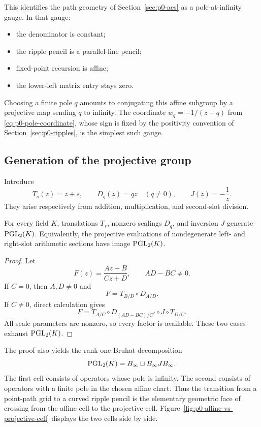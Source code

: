 This identifies the path geometry of Section~\ref{sec:p0-aes} as a
pole-at-infinity gauge.  In that gauge:

\begin{itemize}
  \item the denominator is constant;
  \item the ripple pencil is a parallel-line pencil;
  \item fixed-point recursion is affine;
  \item the lower-left matrix entry stays zero.
\end{itemize}

Choosing a finite pole $q$ amounts to conjugating this affine subgroup by a
projective map sending $q$ to infinity.  The coordinate
$w_q=-1/(z-q)$ from \eqref{eq:p0-pole-coordinate}, whose sign is fixed by the
positivity convention of Section~\ref{sec:p0-ripples}, is the simplest such
gauge.

\subsection{Generation of the projective group}

Introduce
\[
  T_s(z)=z+s,
  \qquad
  D_q(z)=qz\quad(q\ne0),
  \qquad
  J(z)=-\frac1z.
\]
They arise respectively from addition, multiplication, and second-slot
division.

\begin{theorem}
\label{thm:p0-pgl2-generation}
For every field $K$, translations $T_s$, nonzero scalings $D_q$, and inversion
$J$ generate $\operatorname{PGL}_2(K)$.  Equivalently, the projective evaluations of
nondegenerate left- and right-slot arithmetic sections have image
$\operatorname{PGL}_2(K)$.
\end{theorem}

\begin{proof}
Let
\[
  F(z)=\frac{Az+B}{Cz+D},
  \qquad AD-BC\ne0.
\]
If $C=0$, then $A,D\ne0$ and
\[
  F=T_{B/D}\circ D_{A/D}.
\]
If $C\ne0$, direct calculation gives
\begin{equation}\label{eq:p0-projective-factorization}
  F
  =T_{A/C}
   \circ D_{(AD-BC)/C^2}
   \circ J
   \circ T_{D/C}.
\end{equation}
All scale parameters are nonzero, so every factor is available.  These two
cases exhaust $\operatorname{PGL}_2(K)$.
\end{proof}

The proof also yields the rank-one Bruhat decomposition
\begin{equation}\label{eq:p0-bruhat}
  \operatorname{PGL}_2(K)=B_\infty\sqcup B_\infty J B_\infty.
\end{equation}
The first cell consists of operators whose pole is infinity.  The second
consists of operators with a finite pole in the chosen affine chart.  Thus the
transition from a point-path grid to a curved ripple pencil is the elementary
geometric face of crossing from the affine cell to the projective cell.
Figure~\ref{fig:p0-affine-vs-projective-cell} displays the two cells side by
side.

